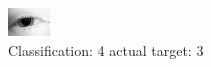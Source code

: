 \begin{figure}[h!]
\begin{center}
\includegraphics[width=0.60\columnwidth]{figures/ID175_class_4_target_3.png}
\end{center}
\caption{ Classification: 4 actual target: 3}
\label{fig:ID175_class_4_target_3}
\end{figure}

